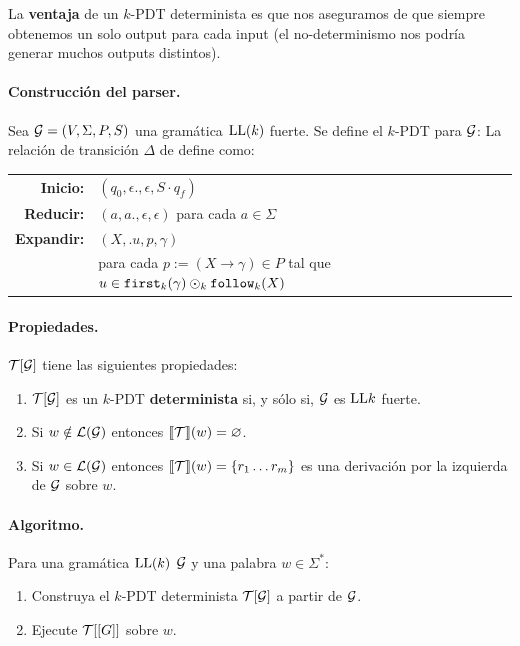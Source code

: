 La \textbf{ventaja} de un $k$-PDT determinista es que nos aseguramos de que siempre obtenemos un solo output para cada input (el no-determinismo nos podría generar muchos outputs distintos).

\paragraph{Construcción del parser.} Sea $\mathcal{G}=(V,\Sigma, P, S)$ una gramática $\text{LL}(k)$ fuerte. Se define el $k$-PDT para $\mathcal{G}$:
La relación de transición $\Delta$ de define como:
\begin{table}[H]
    \centering
    \begin{tabular}{rl}
        \textbf{Inicio:}   & $(q_0, \epsilon., \epsilon, S\cdot q_f)$                                                \\
        \textbf{Reducir:}  & $(a, a., \epsilon, \epsilon)$ para cada $a \in \Sigma$                                  \\
        \textbf{Expandir:} & $(X, .u, p, \gamma)$                                                                    \\
                           & para cada $p:=(X\to\gamma) \in P$ tal que $u \in \texttt{first}_k(\gamma) \odot_k \texttt{follow}_k(X)$
    \end{tabular}
\end{table}

\paragraph{Propiedades.} $\mathcal{T}[\mathcal{G}]$ tiene las siguientes propiedades:
\begin{enumerate}
    \item $\mathcal{T}[\mathcal{G}]$ es un $k$-PDT \textbf{determinista} si, y sólo si, $\mathcal{G}$ es $\text{LL}{k}$ fuerte.
    \item Si $w \notin \mathcal{L}(\mathcal{G})$ entonces $\llbracket \mathcal{T} \rrbracket (w) = \varnothing$.
    \item Si $w \in \mathcal{L}(\mathcal{G})$ entonces $\llbracket \mathcal{T} \rrbracket(w) = \{r_1 \ldots r_m\}$ es una derivación por la izquierda de $\mathcal{G}$ sobre $w$.
\end{enumerate}

\paragraph{Algoritmo.} Para una gramática $\text{LL}(k)$ $\mathcal{G}$ y una palabra $w \in \Sigma^*$:
\begin{enumerate}
    \item Construya el $k$-PDT determinista $\mathcal{T}[\mathcal{G}]$ a partir de $\mathcal{G}$.
    \item Ejecute $\mathcal{T}[\mathcal{[}G]]$ sobre $w$.
\end{enumerate}

